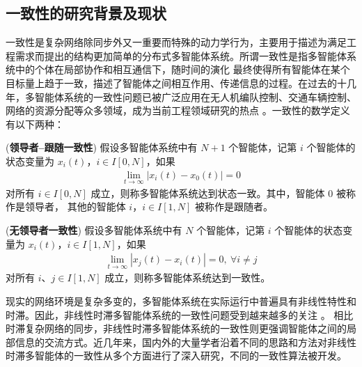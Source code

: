 \subsection{一致性的研究背景及现状}
一致性是复杂网络除同步外又一重要而特殊的动力学行为，主要用于描述为满足工程需求而提出的结构更加简单的分布式多智能体系统。所谓一致性是指多智能体系统中的个体在局部协作和相互通信下，随时间的演化 最终使得所有智能体在某个目标量上趋于一致，描述了智能体之间相互作用、传递信息的过程。在过去的十几年，多智能体系统的一致性问题已被广泛应用在无人机编队控制、交通车辆控制、网络的资源分配等众多领域，成为当前工程领域研究的热点 \cite{2011DistributedLondon,2013An427,2018Multi345}。一致性的数学定义有以下两种：
\begin{definition} \cite{gao2018xuconsensus}(\textbf{领导者--跟随一致性})  假设多智能体系统中有 $N+1$ 个智能体，记第 $i$ 个智能体的状态变量为   $x_i(t)$，$i\in I[0,N]$，如果 
    \begin{align*}
    \lim_{t\rightarrow \infty}|x_i(t)-x_0(t)|=0
    \end{align*}
    对所有 $i\in I[0,N]$ 成立，则称多智能体系统达到状态一致。其中，智能体 $0$ 被称作是领导者， 其他的智能体 $i$，$i\in I[1,N]$ 被称作是跟随者。
\end{definition}   
\begin{definition} 
    \cite{gao2018xuconsensus}(\textbf{无领导者一致性}) 假设多智能体系统中有 $N$ 个智能体，记第 $i$ 个智能体的状态变量为 $x_i(t)$，$i\in I[1,N]$，如果 
    \begin{align*}
    \lim_{t\rightarrow \infty}|x_j(t)-x_i(t)|=0,\ \forall i\neq j 
    \end{align*}
    对所有 $i$、$j\in I[1,N]$ 成立，则称多智能体系统达到一致性。
\end{definition}
 
 现实的网络环境是复杂多变的，多智能体系统在实际运行中普遍具有非线性特性和时滞。因此，非线性时滞多智能体系统的一致性问题受到越来越多的关注 \cite{2015Sampled369,2016Consensus3311,2014Adaptive1217,2020Quasi2964826}。 相比时滞复杂网络的同步，非线性时滞多智能体系统的一致性则更强调智能体之间的局部信息的交流方式。近几年来，国内外的大量学者沿着不同的思路和方法对非线性时滞多智能体的一致性从多个方面进行了深入研究，不同的一致性算法被开发。 

